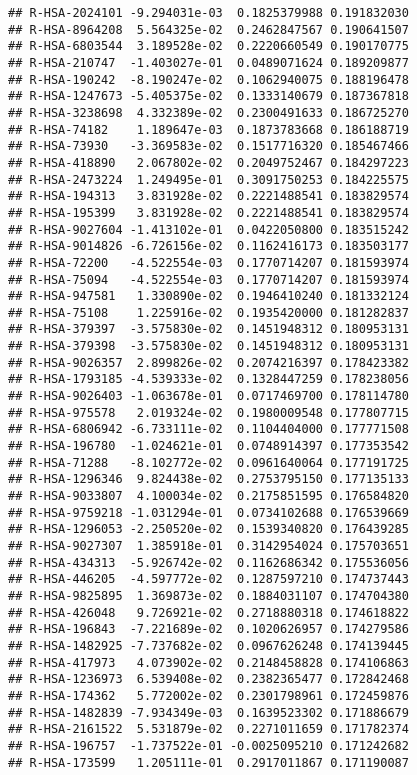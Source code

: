 \documentclass[
]{article}
\begin{document}
\begin{verbatim}
## R-HSA-2024101 -9.294031e-03  0.1825379988 0.191832030
## R-HSA-8964208  5.564325e-02  0.2462847567 0.190641507
## R-HSA-6803544  3.189528e-02  0.2220660549 0.190170775
## R-HSA-210747  -1.403027e-01  0.0489071624 0.189209877
## R-HSA-190242  -8.190247e-02  0.1062940075 0.188196478
## R-HSA-1247673 -5.405375e-02  0.1333140679 0.187367818
## R-HSA-3238698  4.332389e-02  0.2300491633 0.186725270
## R-HSA-74182    1.189647e-03  0.1873783668 0.186188719
## R-HSA-73930   -3.369583e-02  0.1517716320 0.185467466
## R-HSA-418890   2.067802e-02  0.2049752467 0.184297223
## R-HSA-2473224  1.249495e-01  0.3091750253 0.184225575
## R-HSA-194313   3.831928e-02  0.2221488541 0.183829574
## R-HSA-195399   3.831928e-02  0.2221488541 0.183829574
## R-HSA-9027604 -1.413102e-01  0.0422050800 0.183515242
## R-HSA-9014826 -6.726156e-02  0.1162416173 0.183503177
## R-HSA-72200   -4.522554e-03  0.1770714207 0.181593974
## R-HSA-75094   -4.522554e-03  0.1770714207 0.181593974
## R-HSA-947581   1.330890e-02  0.1946410240 0.181332124
## R-HSA-75108    1.225916e-02  0.1935420000 0.181282837
## R-HSA-379397  -3.575830e-02  0.1451948312 0.180953131
## R-HSA-379398  -3.575830e-02  0.1451948312 0.180953131
## R-HSA-9026357  2.899826e-02  0.2074216397 0.178423382
## R-HSA-1793185 -4.539333e-02  0.1328447259 0.178238056
## R-HSA-9026403 -1.063678e-01  0.0717469700 0.178114780
## R-HSA-975578   2.019324e-02  0.1980009548 0.177807715
## R-HSA-6806942 -6.733111e-02  0.1104404000 0.177771508
## R-HSA-196780  -1.024621e-01  0.0748914397 0.177353542
## R-HSA-71288   -8.102772e-02  0.0961640064 0.177191725
## R-HSA-1296346  9.824438e-02  0.2753795150 0.177135133
## R-HSA-9033807  4.100034e-02  0.2175851595 0.176584820
## R-HSA-9759218 -1.031294e-01  0.0734102688 0.176539669
## R-HSA-1296053 -2.250520e-02  0.1539340820 0.176439285
## R-HSA-9027307  1.385918e-01  0.3142954024 0.175703651
## R-HSA-434313  -5.926742e-02  0.1162686342 0.175536056
## R-HSA-446205  -4.597772e-02  0.1287597210 0.174737443
## R-HSA-9825895  1.369873e-02  0.1884031107 0.174704380
## R-HSA-426048   9.726921e-02  0.2718880318 0.174618822
## R-HSA-196843  -7.221689e-02  0.1020626957 0.174279586
## R-HSA-1482925 -7.737682e-02  0.0967626248 0.174139445
## R-HSA-417973   4.073902e-02  0.2148458828 0.174106863
## R-HSA-1236973  6.539408e-02  0.2382365477 0.172842468
## R-HSA-174362   5.772002e-02  0.2301798961 0.172459876
## R-HSA-1482839 -7.934349e-03  0.1639523302 0.171886679
## R-HSA-2161522  5.531879e-02  0.2271011659 0.171782374
## R-HSA-196757  -1.737522e-01 -0.0025095210 0.171242682
## R-HSA-173599   1.205111e-01  0.2917011867 0.171190087

\end{verbatim}
\end{document}
